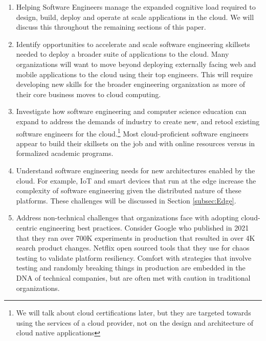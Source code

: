 \documentclass[conference]{IEEEtran}
\begin{document}
\begin{enumerate}
	\item Helping Software Engineers manage the expanded cognitive load required to design, build, deploy and operate at scale  applications in the cloud. We will discuss this throughout the remaining sections of this paper. 
	
	\item Identify opportunities to accelerate and scale software engineering skillsets needed to deploy a broader suite of applications to the cloud. Many organizations will want to move beyond deploying externally facing web and mobile applications to the cloud using their top engineers. This will require developing new skills for the broader engineering organization as more of their core business moves to cloud computing.
	
	\item Investigate how software engineering and computer science education can expand to address the demands of industry to create new, and retool existing software engineers for the cloud.\footnote{We will talk about cloud certifications later, but they are targeted towards using the services of a cloud provider, not on the design and architecture of cloud native applications} Most cloud-proficient software engineers appear to build their skillsets on the job and with online resources versus in formalized academic programs. 
	
	\item Understand software engineering needs for new architectures enabled by the cloud.  For example, IoT and smart devices that run at the edge increase the complexity of software engineering given the  distributed nature of these platforms.  These challenges will be discussed in Section \ref{subsec:Edge}.  
	
	\item Address non-technical challenges that organizations face with adopting cloud-centric engineering best practices. Consider Google who published in 2021\cite{GoogleDevOps} that they ran over 700K experiments in production that resulted in over 4K search product changes. Netflix open sourced tools\cite{NetflixChaos} that they use for chaos testing to validate platform resiliency.  Comfort with strategies that involve testing and randomly breaking things in production are embedded in the DNA of technical companies, but are often met with caution in traditional organizations. 
\end{enumerate}
\end{document}
